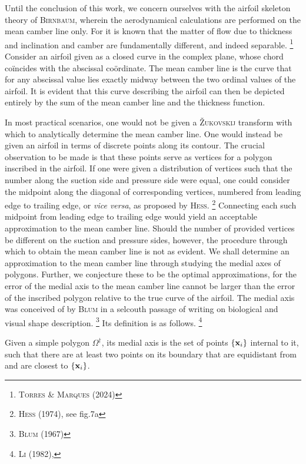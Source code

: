 Until the conclusion of this work, we concern ourselves with the airfoil skeleton theory of \textsc{Birnbaum}, wherein the aerodynamical calculations are performed on the mean camber line only.
For it is known that the matter of flow due to thickness and inclination and camber are fundamentally different, and indeed separable.%
\footnote{%
  \cite{torres2024nonlinear} \textsc{Torres} \& \textsc{Marques} (2024)
}
Consider an airfoil given as a closed curve in the complex plane, whose chord coïncides with the abscissal coördinate.
The mean camber line is the curve that for any abscissal value lies exactly midway between the two ordinal values of the airfoil.
It is evident that this curve describing the airfoil can then be depicted entirely by the sum of the mean camber line and the thickness function.

In most practical scenarios, one would not be given a \textsc{Žukovskij} transform with which to analytically determine the mean camber line.
One would instead be given an airfoil in terms of discrete points along its contour.
The crucial observation to be made is that these points serve as vertices for a polygon inscribed in the airfoil.
If one were given a distribution of vertices such that the number along the suction side and pressure side were equal, one could consider the midpoint along the diagonal of corresponding vertices, numbered from leading edge to trailing edge, or \emph{vice versa}, as proposed by \textsc{Hess}.%
\footnote{%
        \cite{hess1974problem} \textsc{Hess} (1974), see fig.7a
}
Connecting each such midpoint from leading edge to trailing edge would yield an acceptable approximation to the mean camber line.
Should the number of provided vertices be different on the suction and pressure sides, however, the procedure through which to obtain the mean camber line is not as evident.
We shall determine an approximation to the mean camber line through studying the medial axes of polygons.
Further, we conjecture these to be the optimal approximations, for the error of the medial axis to the mean camber line cannot be larger than the error of the inscribed polygon relative to the true curve of the airfoil.
The medial axis was conceived of by \textsc{Blum} in a selcouth passage of writing on biological and visual shape description.%
\footnote{%
        \cite{blum1967transformation} \textsc{Blum} (1967)
}
Its definition is as follows.%
\footnote{%
        \cite{li1982medial} \textsc{Li} (1982), 
}

\begin{definition}
  Given a simple polygon $\Omega^{\dag}$, its medial axis is the set of points $\{\mathbf{x}_i\}$ internal to it, such that there are at least two points on its boundary that are equidistant from and are closest to $\{ \mathbf{x}_i \}$.
\end{definition}

